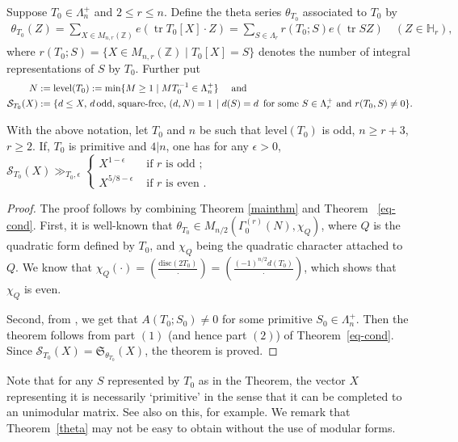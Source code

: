 \documentclass[11pt]{amsart}
\numberwithin{equation}{section}
\newcommand{\mbb}{\mathbb}
\newcommand{\mc}{\mathcal}
\newcommand{\mk}{\mathfrak}
\newcommand{\mrm}{\mathrm} %
\DeclareMathOperator{\tr}{tr}
\newcommand{\z}{\mathbb{Z}}
\newcommand{\h}{\mbb{H}}
\newcommand{\q}{\quad}
\begin{document}
Suppose $T_0 \in \Lambda_n^+$ and $2 \le r \le n$. Define the theta series $\theta_{T_0}$ associated to $T_0$ by
\begin{align}
    \theta_{T_0}(Z) = \sum_{X \in M_{n,r}(\z)} e(\tr T_0[X] \cdot Z) = \sum_{S \in \Lambda_r} r(T_0;S) e(\tr S Z) \q (Z \in \h_r),
\end{align}
where $\displaystyle r(T_0;S)=\{ X \in M_{n,r}(\z) \mid T_0[X]=S\}$
denotes the number of integral representations of $S$ by $T_0$. Further put
\begin{align}
N&:=\mrm{level}(T_0) := \min \{M \ge 1 \mid MT_0^{-1} \in \Lambda_n^+ \} \q \text{ and }\\
{\mc S}_{T_0} (X) &:= \{ d \leq X, \,  d \, \mbox{\rm{odd, square-free}}, \, (d,N)=1 \, \mid  d(S)=d \, \mbox{\rm{ for some }} S\in \Lambda_r^+ \mbox{\rm{ and }}  r(T_0,S) \neq 0 \}.  
\end{align}


\begin{theorem}\label{theta}
    With the above notation, let  $T_0$ and $n$ be such that $\mrm{level}(T_0)$ is odd,    $n \ge r+3$, $r \ge 2$. If, $T_0$ is primitive and $4|n$, one has for any $\epsilon>0$,
    $\displaystyle {\mc S}_{T_0} (X) \gg_{T_0, \epsilon} \begin{cases} X^{1-\epsilon} &\text{ if } r \text{ is odd };  \\ 
X^{5/8 - \epsilon} &\text{ if } r \text{ is even }.
\end{cases}$
\end{theorem}

\begin{proof}
    The proof follows by combining Theorem \ref{mainthm} and Theorem ~\ref{eq-cond}. First, it is well-known that $\theta_{T_0} \in M_{n/2}(\Gamma_0^{(r)}(N), \chi_Q)$, where $Q$ is the quadratic form defined by $T_0$, and $\chi_Q$ being the quadratic character attached to $Q$. We know that $\chi_Q(\cdot) = \left( \frac{ \mrm{disc}(2T_0) }{\cdot} \right)= \left( \frac{ (-1)^{n/2} d(T_0) }{\cdot} \right)$, which shows that $\chi_Q$ is even.
    
    Second, from \cite{martin2025prime}, we get that $A(T_0;S_0) \neq 0$ for some primitive $S_0 \in \Lambda_n^+$. Then the theorem follows from part $(1)$ (and hence part $(2)$) of Theorem~\ref{eq-cond}. Since ${\mc S}_{T_0} (X) = {\mk S}_{\theta_{T_0}} (X)$, the theorem is proved.
\end{proof}
Note that for any $S$ represented by $T_0$ as in the Theorem, the vector $X$ representing it is necessarily `primitive' in the sense that it can be completed to an unimodular matrix. See also \cite{martin2005dimensions} on this, for example. We remark that Theorem~\ref{theta} may not be easy to obtain without the use of modular forms.

\printbibliography
\end{document}
